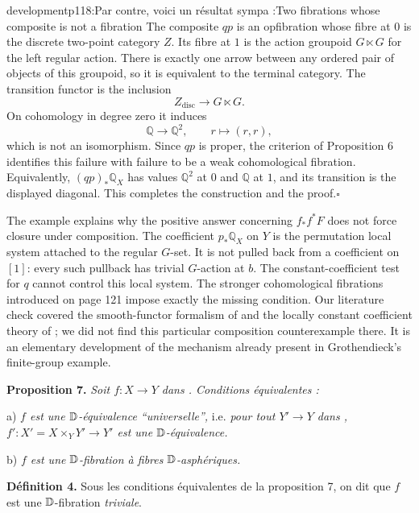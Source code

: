 \begin{dcomment}{development}{p118:Par contre, voici un résultat sympa :}{Two fibrations whose composite is not a fibration}
The composite $qp$ is an opfibration whose fibre at $0$ is the discrete two-point category $Z$. Its fibre at $1$ is the action groupoid $G\ltimes G$ for the left regular action. There is exactly one arrow between any ordered pair of objects of this groupoid, so it is equivalent to the terminal category. The transition functor is the inclusion
\[
 Z_{\mathrm{disc}}\longrightarrow G\ltimes G.
\]
On cohomology in degree zero it induces
\[
 \mathbb Q\longrightarrow\mathbb Q^2,
 \qquad r\longmapsto(r,r),
\]
which is not an isomorphism. Since $qp$ is proper, the criterion of Proposition 6 identifies this failure with failure to be a weak cohomological fibration. Equivalently, $(qp)_*\mathbb Q_X$ has values $\mathbb Q^2$ at $0$ and $\mathbb Q$ at $1$, and its transition is the displayed diagonal. This completes the construction and the proof.\hfill$\square$

The example explains why the positive answer concerning $f_*f^*F$ does not force closure under composition. The coefficient $p_*\mathbb Q_X$ on $Y$ is the permutation local system attached to the regular $G$-set. It is not pulled back from a coefficient on $[1]$: every such pullback has trivial $G$-action at $b$. The constant-coefficient test for $q$ cannot control this local system. The stronger cohomological fibrations introduced on page 121 impose exactly the missing condition. Our literature check covered the smooth-functor formalism of \citet{Maltsiniotis2005Asphericite} and the locally constant coefficient theory of \citet{Cisinski2009LocallyConstant}; we did not find this particular composition counterexample there. It is an elementary development of the mechanism already present in Grothendieck's finite-group example.
\end{dcomment}


\textbf{Proposition 7.} \textit{Soit $f : X \to Y$ dans \Dia. Conditions équivalentes :}

a) \textit{$f$ est une $\mathbb{D}$-équivalence “universelle”,} i.e. \textit{pour tout $Y' \to Y$ dans \Dia, $f' : X' = X \times_Y Y' \to Y'$ est une $\mathbb{D}$-équivalence.}

b) \textit{$f$ est une $\mathbb{D}$-fibration à fibres $\mathbb{D}$-asphériques.}

\textbf{Définition 4.} Sous les conditions équivalentes de la proposition 7, on dit que $f$ est une $\mathbb{D}$-fibration \textit{triviale}.


